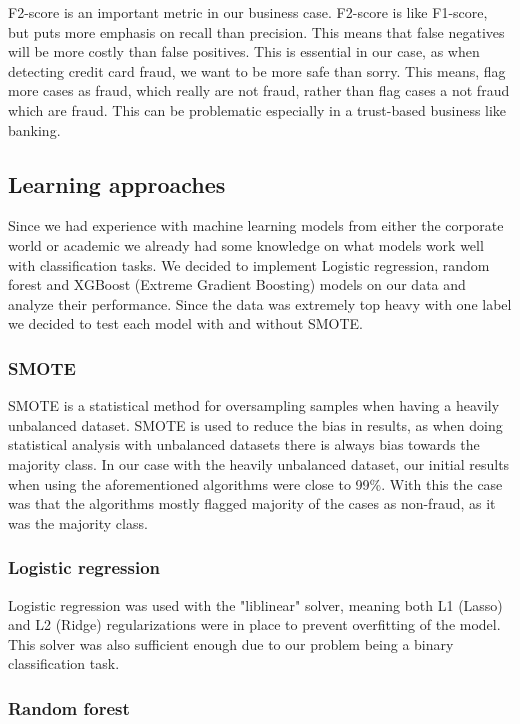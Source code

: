 \documentclass{article}
\begin{document}
F2-score is an important metric in our business case. F2-score is like F1-score, but puts more emphasis on recall than precision. This means that false negatives will be more costly than false positives. This is essential in our case, as when detecting credit card fraud, we want to be more safe than sorry. This means, flag more cases as fraud, which really are not fraud, rather than flag cases a not fraud which are fraud. This can be problematic especially in a trust-based business like banking.

\subsection{Learning approaches}
Since we had experience with machine learning models from either the corporate world or academic we already had some knowledge on what models work well with classification tasks. We decided to implement Logistic regression, random forest and XGBoost (Extreme Gradient Boosting) models on our data and analyze their performance. Since the data was extremely top heavy with one label we decided to test each model with and without SMOTE. 
\subsubsection{SMOTE}

SMOTE is a statistical method for oversampling samples when having a heavily unbalanced dataset. SMOTE is used to reduce the bias in results, as when doing statistical analysis with unbalanced datasets there is always bias towards the majority class. In our case with the heavily unbalanced dataset, our initial results when using the aforementioned algorithms were close to 99\%. With this the case was that the algorithms mostly flagged majority of the cases as non-fraud, as it was the majority class.
\subsubsection{Logistic regression}

Logistic regression was used with the "liblinear" solver, meaning both L1 (Lasso) and L2 (Ridge) regularizations were in place to prevent overfitting of the model. This solver was also sufficient enough due to our problem being a binary classification task.

\subsubsection{Random forest}
\end{document}
